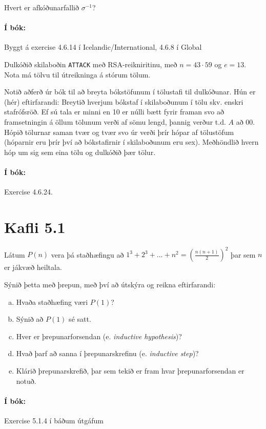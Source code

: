 \documentclass{article}
\begin{document}
Hvert er afkóðunarfallið $\sigma^{-1}$?

\paragraph{Í bók:} Byggt á exercise 4.6.14 í Icelandic/International, 4.6.8 í Global

\question Dulkóðið skilaboðin \texttt{ATTACK} með RSA-reikniritinu, með $n = 43\cdot 59$ og $e=13$. Nota má tölvu til útreikninga á stórum tölum.

Notið aðferð úr bók til að breyta bókstöfunum í tölustafi til dulkóðunar. Hún er (hér) eftirfarandi: Breytið hverjum bókstaf í skilaboðunum í tölu skv. enskri stafrófsröð. Ef sú tala er minni en 10 er núlli bætt fyrir framan svo að framsetningin á öllum tölunum verði af sömu lengd, þannig verður t.d. $A$ að $00$. Hópið tölurnar saman tvær og tvær svo úr verði þrír hópar af tölustöfum (hóparnir eru þrír því að bókstafirnir í skilaboðunum eru sex). Meðhöndlið hvern hóp um sig sem eina tölu og dulkóðið þær tölur.

\paragraph{Í bók:} Exercise 4.6.24.

\section{Kafli 5.1}

\question Látum $P(n)$ vera þá staðhæfingu að $1^3+2^3+\ldots + n^2 = \left( \frac{n(n+1)}{2} \right)^2$ þar sem $n$ er jákvæð heiltala.

Sýnið þetta með þrepun, með því að útskýra og reikna eftirfarandi:

\begin{enumerate}[a)]
    \item Hvaða staðhæfing væri $P(1)$?
    \item Sýnið að $P(1)$ sé satt.
    \item Hver er þrepunarforsendan (e. \emph{inductive hypothesis})?
    \item Hvað þarf að sanna í þrepunarskrefinu (e. \emph{inductive step})?
    \item Klárið þrepunarskrefið, þar sem tekið er fram hvar þrepunarforsendan er notuð.
\end{enumerate}

\paragraph{Í bók:} Exercise 5.1.4 í báðum útgáfum
\end{document}
